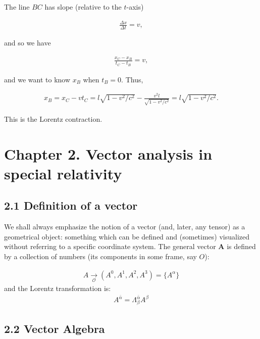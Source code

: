 \documentclass[12pt]{book}
\begin{document}
        The line \( BC \) has slope (relative to the \( t \)-axis) 
        
        \begin{align}
        \frac{\Delta x}{\Delta t} = v,
        \end{align}
        
        and so we have
        
        \begin{align}
        \frac{x_C - x_B}{t_C - t_B} = v,
        \end{align}
        
        and we want to know \( x_B \) when \( t_B = 0 \). Thus,
        
        \begin{align}
        x_B = x_C - vt_C = l \sqrt{1 - v^2/c^2} - \frac{v^2l}{\sqrt{1 - v^2/c^2}} = l \sqrt{1 - v^2/c^2}.
        \end{align}
        
        This is the Lorentz contraction.
                
\section{Chapter 2. Vector analysis in special relativity}

    \subsection{2.1 Definition of a vector}

        We shall always emphasize the notion of a vector (and, later, any tensor) as a geometrical object: something which can be defined and (sometimes) visualized without referring to a specific coordinate system.
        The general vector \( \mathbf{A} \) is defined by a collection of numbers (its components in some frame, say \( O \)):

        \begin{align}
        A \underset{\mathcal{O}}{\rightarrow} (A^0, A^1, A^2, A^3) = \{A^\alpha\} 
        \end{align}
        and the Lorentz transformation is:
        \begin{align}
            A^{\bar{\alpha}}=\Lambda^{\bar{\alpha}}_\beta A^\beta
        \end{align}
    
    \subsection{2.2 Vector Algebra}
\end{document}
